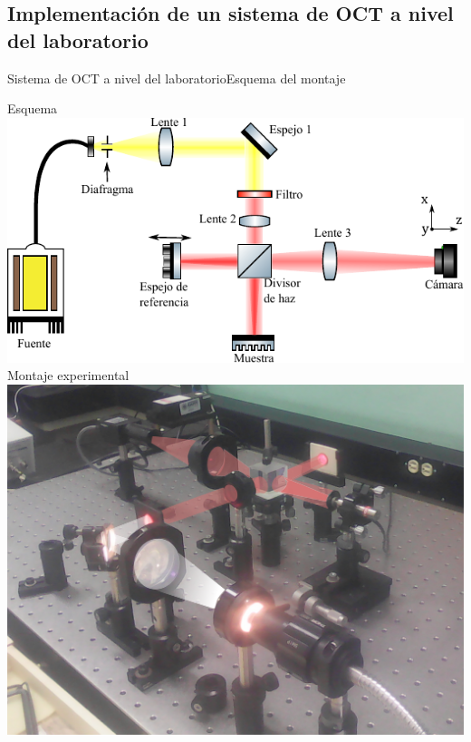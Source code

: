 \documentclass[fleqn,10pt]{beamer}
\begin{document}
\subsection[Sistema de OCT a nivel del laboratorio]{Implementación de un sistema de OCT a nivel del laboratorio}
\begin{frame}{Sistema de OCT a nivel del laboratorio}{Esquema del montaje}
	\begin{multicols}{2}
		\centering
		Esquema
		\includegraphics[width=1.0\linewidth]{AAUgraphics/pt2/Montaje_scheme}
		\newpage
		Montaje experimental
		\includegraphics[width=0.8\linewidth]{AAUgraphics/pt2/Montaje}
	\end{multicols}
\end{frame}
\end{document}
